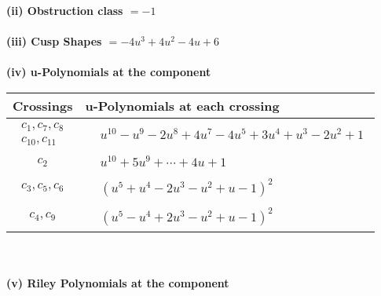 \documentclass[1p]{elsarticle_modified}
\theoremstyle{definition}
\begin{document}
\flushleft \textbf{(ii) Obstruction class $= -1$}\\~\\
\flushleft \textbf{(iii) Cusp Shapes $= -4 u^3+4 u^2-4 u+6$}\\~\\
\newpage\renewcommand{\arraystretch}{1}
\flushleft \textbf{(iv) u-Polynomials at the component}\newline \\
\begin{tabular}{m{50pt}|m{274pt}}
Crossings & \hspace{64pt}u-Polynomials at each crossing \\
\hline $$\begin{aligned}c_{1},c_{7},c_{8}\\c_{10},c_{11}\end{aligned}$$&$\begin{aligned}
&u^{10}- u^9-2 u^8+4 u^7-4 u^5+3 u^4+u^3-2 u^2+1
\end{aligned}$\\
\hline $$\begin{aligned}c_{2}\end{aligned}$$&$\begin{aligned}
&u^{10}+5 u^9+\cdots+4 u+1
\end{aligned}$\\
\hline $$\begin{aligned}c_{3},c_{5},c_{6}\end{aligned}$$&$\begin{aligned}
&(u^5+u^4-2 u^3- u^2+u-1)^2
\end{aligned}$\\
\hline $$\begin{aligned}c_{4},c_{9}\end{aligned}$$&$\begin{aligned}
&(u^5- u^4+2 u^3- u^2+u-1)^2
\end{aligned}$\\
\hline
\end{tabular}\\~\\
\newpage\renewcommand{\arraystretch}{1}
\flushleft \textbf{(v) Riley Polynomials at the component}\newline \\
\end{document}
